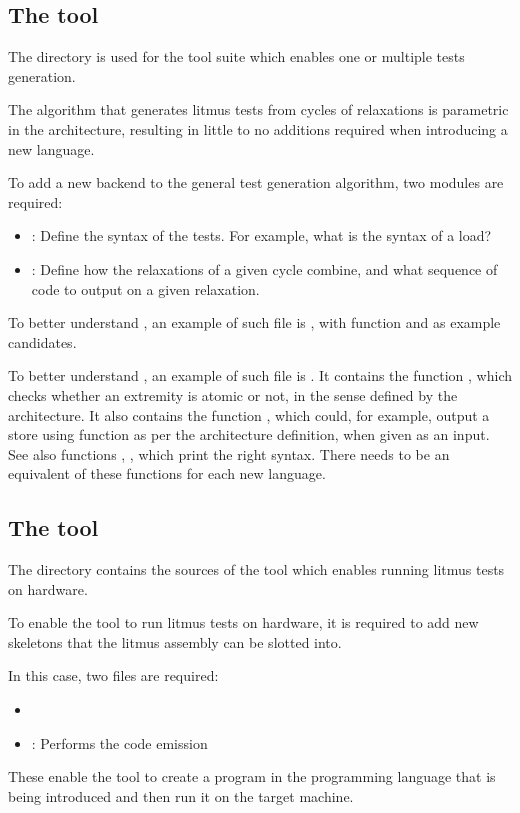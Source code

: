 \subsection{The \diy{} tool}

The  directory is used for the \diy{} tool suite which
enables one or multiple tests generation.

The algorithm that generates litmus tests from cycles of relaxations is
parametric in the architecture, resulting in little to no additions required
when introducing a new language.

To add a new backend to the general test generation algorithm, two modules are required:
\begin{itemize}
\item {}: Define the syntax of the tests. For example, what
is the syntax of a load?
\item {}: Define how the relaxations of a given cycle
combine, and what sequence of code to output on a given relaxation.
\end{itemize}

To better understand , an example of such file is
, with function  and  as
example candidates.

To better understand , an example of such file is
. It contains the function , which
checks whether an extremity is atomic or not, in the sense defined by the
architecture. It also contains the function , which
could, for example, output a store using function  as per
the architecture definition, when given  as an input. See also
functions , ,  which
print the right syntax. There needs to be an equivalent of these functions for
each new language.

\subsection{The \litmus{} tool}

The  directory contains the sources of the \litmus{}
tool which enables running litmus tests on hardware.

To enable the \litmus{} tool to run litmus tests on hardware, it is
required to add new skeletons that the litmus assembly can be slotted into.

In this case, two files are required:
\begin{itemize}
\item {}
\item {}: Performs the code emission
\end{itemize}

These enable the \litmus{} tool to create a program in the programming
language that is being introduced and then run it on the target machine.
